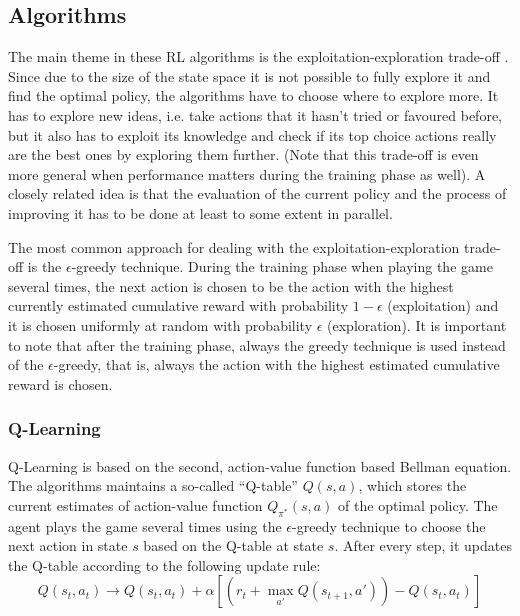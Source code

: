 \subsection{Algorithms}


The main theme in these RL algorithms is the exploitation-exploration trade-off \cite{kaelbling1996explorationexploitation}. Since due to the size of the state space it is not possible to fully explore it and find the optimal policy, the algorithms have to choose where to explore more. It has to explore new ideas, i.e. take actions that it hasn't tried or favoured before, but it also has to exploit its knowledge and check if its top choice actions really are the best ones by exploring them further. (Note that this trade-off is even more general when performance matters during the training phase as well). A closely related idea is that the evaluation of the current policy and the process of improving it has to be done at least to some extent in parallel.


The most common approach for dealing with the exploitation-exploration trade-off is the $\epsilon$-greedy technique. During the training phase when playing the game several times, the next action is chosen to be the action with the highest currently estimated cumulative reward with probability $1-\epsilon$ (exploitation) and it is chosen uniformly at random with probability $\epsilon$ (exploration). It is important to note that after the training phase, always the greedy technique is used instead of the $\epsilon$-greedy, that is, always the action with the highest estimated cumulative reward is chosen.



\subsubsection{Q-Learning}


Q-Learning \cite{watkins1989qlearning} is based on the second, action-value function based Bellman equation. The algorithms maintains a so-called ``Q-table'' $Q(s,a)$, which stores the current estimates of action-value function $Q_{\pi^*}(s,a)$ of the optimal policy. The agent plays the game several times using the $\epsilon$-greedy technique to choose the next action in state $s$ based on the Q-table at state $s$. After every step, it updates the Q-table according to the following update rule:
\begin{equation} \label{eq:q-learningUpdate}
Q(s_t,a_t) \longrightarrow Q(s_t,a_t) + \alpha[( r_t + \max_{a'} Q(s_{t+1}, a')) - Q(s_t,a_t)]
\end{equation}


